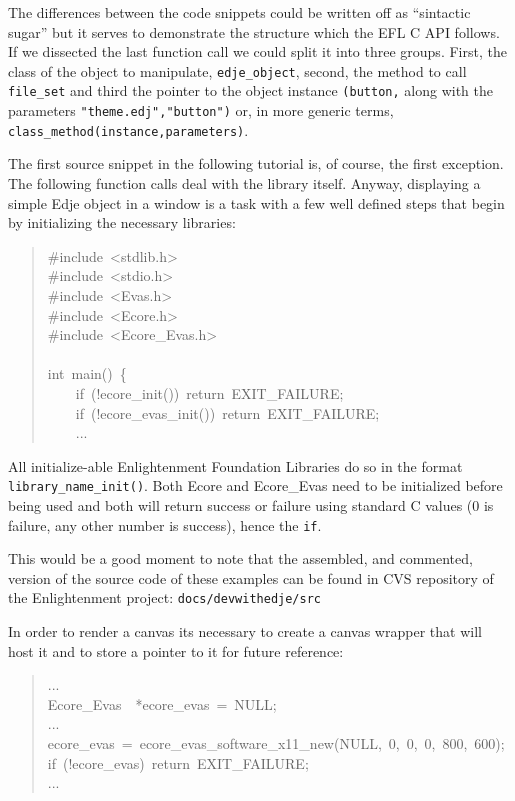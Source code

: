 \documentclass[12pt,a4paper,english]{book}
\begin{document}
The differences between the code snippets could be written off as ``sintactic
sugar'' but it serves to demonstrate the structure which the EFL C API follows.
If we dissected the last function call we could split it into three groups.
First, the class of the object to manipulate, \texttt{edje{\_}object}, second, the
method to call \texttt{file{\_}set} and third the pointer to the object instance
\texttt{(button,} along with the parameters \texttt{"theme.edj","button")} or, in more
generic terms, \texttt{class{\_}method(instance,parameters)}.

The first source snippet in the following tutorial is, of course, the first
exception. The following function calls deal with the library itself. Anyway,
displaying a simple Edje object in a window is a task with a few well defined
steps that begin by initializing the necessary libraries:
\begin{quote}{\ttfamily \raggedright \noindent
{\#}include~<stdlib.h>~\\
{\#}include~<stdio.h>~\\
{\#}include~<Evas.h>~\\
{\#}include~<Ecore.h>~\\
{\#}include~<Ecore{\_}Evas.h>~\\
~\\
int~main()~{\{}~\\
~~~~if~(!ecore{\_}init())~return~EXIT{\_}FAILURE;~\\
~~~~if~(!ecore{\_}evas{\_}init())~return~EXIT{\_}FAILURE;~\\
~~~~...
}\end{quote}

All initialize-able Enlightenment Foundation Libraries do so in the format
\texttt{library{\_}name{\_}init()}. Both Ecore and Ecore{\_}Evas need to be initialized
before being used and both will return success or failure using standard C
values (0 is failure, any other number is success), hence the \texttt{if}.

This would be a good moment to note that the assembled, and commented, version
of the source code of these examples can be found in CVS repository of the
Enlightenment project: \texttt{docs/devwithedje/src}

In order to render a canvas its necessary to create a canvas wrapper that will
host it and to store a pointer to it for future reference:
\begin{quote}{\ttfamily \raggedright \noindent
...~\\
Ecore{\_}Evas~~*ecore{\_}evas~=~NULL;~\\
...~\\
ecore{\_}evas~=~ecore{\_}evas{\_}software{\_}x11{\_}new(NULL,~0,~0,~0,~800,~600);~\\
if~(!ecore{\_}evas)~return~EXIT{\_}FAILURE;~\\
...
}\end{quote}
\end{document}
